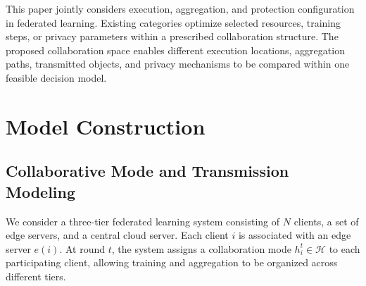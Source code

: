 \documentclass[5p,times]{elsarticle}
\theoremstyle{plain}
\theoremstyle{definition}
\theoremstyle{remark}
\begin{document}
This paper jointly considers execution, aggregation, and protection
configuration in federated learning.
Existing categories optimize selected resources, training steps, or privacy
parameters within a prescribed collaboration structure. The proposed collaboration space enables different execution locations,
aggregation paths, transmitted objects, and privacy mechanisms to be compared
within one feasible decision model.
\section{Model Construction}
\label{sec:model}
\subsection{Collaborative Mode and Transmission Modeling}
\label{sec:link_model}

We consider a three-tier federated learning system
consisting of \(N\) clients, a set of edge servers,
and a central cloud server. Each client \(i\) is
associated with an edge server \(e(i)\). At round
\(t\), the system assigns a collaboration mode
\(h_i^t\in\mathcal H\) to each participating client,
allowing training and aggregation to be organized
across different tiers.
\end{document}
